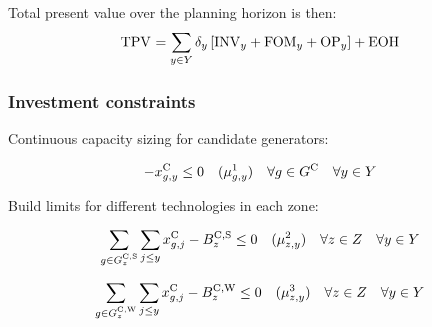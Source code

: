 \documentclass{article}
\begin{document}
Total present value over the planning horizon is then:
\begin{align}
	\begin{split}
		\cTotalPresentValue & = \sum\limits_{\iYear \in \sYears} \cDiscountRate \left[\cInvestmentCost + \cFixedOperationsMaintenanceCost + \cOperatingCost[\iYear] \right] 
		+ \cEndOfHorizonCost \\
	\end{split}
\end{align}

\subsubsection{Investment constraints}
Continuous capacity sizing for candidate generators:

\begin{equation}
	- \vInstalledCapacity[\iGenerator,\iYear] \leq 0 \quad (\dNonNegativeCandidateCapacity) \quad \forall \iGenerator \in \sGeneratorsCandidate \quad \forall \iYear \in \sYears
\end{equation}


Build limits for different technologies in each zone:

\begin{equation}
\sum\limits_{\iGenerator \in \sGeneratorsCandidateSolar_{\iZone}} \sum\limits_{\iYearAlias \leq \iYear} \vInstalledCapacity[\iGenerator,\iYearAlias] - \cBuildLimitSolar \leq 0 \quad (\dSolarBuildLimit) \quad \forall \iZone \in \sZones \quad \forall \iYear \in \sYears
\end{equation}


\begin{equation}
\sum\limits_{\iGenerator \in \sGeneratorsCandidateWind_{\iZone}} \sum\limits_{\iYearAlias \leq \iYear} \vInstalledCapacity[\iGenerator,\iYearAlias] - \cBuildLimitWind \leq 0 \quad (\dWindBuildLimit) \quad \forall \iZone \in \sZones \quad \forall \iYear \in \sYears 
\end{equation}
\end{document}
